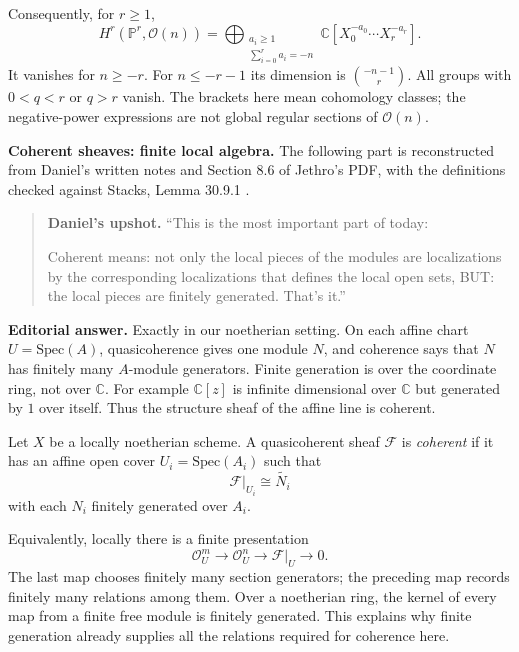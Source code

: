 Consequently, for $r\geq1$,
$$
H^r(\mathbb{P}^r,\mathcal{O}(n))
=\bigoplus_{\substack{a_i\geq1\\
\sum_{i=0}^r a_i=-n}}
\mathbb{C}[X_0^{-a_0}\cdots X_r^{-a_r}].
$$
It vanishes for $n\geq-r$. For
$n\leq-r-1$ its dimension is
$\binom{-n-1}{r}$. All groups with
$0<q<r$ or $q>r$ vanish. The brackets here
mean cohomology classes; the negative-power
expressions are not global regular
sections of $\mathcal{O}(n)$.

\medskip\noindent
{\bf Coherent sheaves: finite local algebra.}
The following part is reconstructed from
Daniel's written notes and Section 8.6 of
Jethro's PDF, with the definitions checked
against Stacks, Lemma 30.9.1
\cite{stacks-project}.

\begin{quote}
\textbf{Daniel's upshot.}
``This is the most important part of today:

Coherent means: not only the local pieces
 of the modules are localizations by the
 corresponding localizations that defines
 the local open sets, BUT: the local pieces
 are finitely generated. That's it.''
\end{quote}

\noindent
\textbf{Editorial answer.} Exactly in our
noetherian setting. On each affine chart
$U=\mathrm{Spec}(A)$, quasicoherence gives
one module $N$, and coherence says that
$N$ has finitely many $A$-module
generators. Finite generation is over the
coordinate ring, not over $\mathbb{C}$.
For example $\mathbb{C}[z]$ is infinite
dimensional over $\mathbb{C}$ but generated
by $1$ over itself. Thus the structure
sheaf of the affine line is coherent.

\begin{definition}
\label{definition-coherent-sheaf-jethro}
Let $X$ be a locally noetherian scheme.
A quasicoherent sheaf $\mathcal{F}$ is
\textit{coherent} if it has an affine open
cover $U_i=\mathrm{Spec}(A_i)$ such that
$$
\mathcal{F}|_{U_i}\cong\widetilde{N_i}
$$
with each $N_i$ finitely generated over
$A_i$.
\end{definition}

Equivalently, locally there is a finite
presentation
$$
\mathcal{O}_U^m\longrightarrow
\mathcal{O}_U^n\longrightarrow
\mathcal{F}|_U\longrightarrow0.
$$
The last map chooses finitely many
section generators; the preceding map
records finitely many relations among
them. Over a noetherian ring, the kernel
of every map from a finite free module is
finitely generated. This explains why
finite generation already supplies all the
relations required for coherence here.

